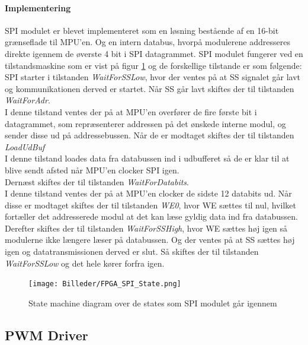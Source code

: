 \paragraph*{Implementering}
SPI modulet er blevet implementeret som en løsning bestående af en 16-bit grænseflade til MPU'en. Og en intern databus, hvorpå modulerene addresseres direkte igennem de øverste 4 bit i SPI datagrammet. SPI modulet fungerer ved en tilstandsmaskine som er vist på figur \ref{fig:FPGA_SPI_State} og de forskellige tilstande er som følgende:\\
SPI starter i tilstanden \textit{WaitForSSLow}, hvor der ventes på at SS signalet går lavt og kommunikationen derved er startet. Når SS går lavt skiftes der til tilstanden \textit{WaitForAdr}. \\ 
I denne tilstand ventes der på at MPU'en overfører de fire første bit i datagrammet, som repræsenterer addressen på det ønskede interne modul, og sender disse ud på addressebussen. Når de er modtaget skiftes der til tilstanden \textit{LoadUdBuf} \\
I denne tilstand loades data fra databussen ind i udbufferet så de er klar til at blive sendt afsted når MPU'en clocker SPI igen.\\
Dernæst skiftes der til tilstanden \textit{WaitForDatabits}. \\
I denne tilstand ventes der på at MPU'en clocker de sidste 12 databits ud. Når disse er modtaget skiftes der til tilstanden \textit{WE0}, hvor WE sættes til nul, hvilket fortæller det addresserede modul at det kan læse gyldig data ind fra databussen. \\ Derefter skiftes der til tilstanden \textit{WaitForSSHigh}, hvor WE sættes høj igen så modulerne ikke længere læser på databussen. Og der ventes på at SS sættes høj igen og datatransmissionen derved er slut. Så skiftes der til tilstanden \textit{WaitForSSLow} og det hele kører forfra igen.

\begin{figure}[ht]
	\begin{center}
		\texttt{[image: Billeder/FPGA\_SPI\_State.png]}
	\end{center}
\caption{State machine diagram over de states som SPI modulet går igennem}
\label{fig:FPGA_SPI_State}
\end{figure}

\subsection{PWM Driver}

